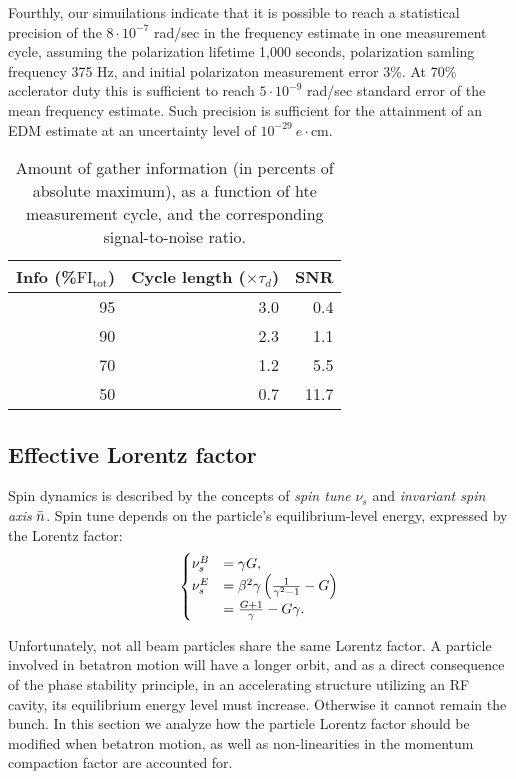 Fourthly, our simuilations indicate that it is possible to reach a statistical precision of the 
$8\cdot 10^{-7}$ rad/sec in the frequency estimate in one measurement cycle, assuming the polarization
lifetime 1,000 seconds, polarization samling frequency 375 Hz, and initial polarizaton measurement error 3\%.
At 70\% acclerator duty this is sufficient to reach $5\cdot 10^{-9}$ rad/sec standard error of the mean
frequency estimate. Such precision is sufficient for the attainment of an EDM estimate
at an uncertainty level of $10^{-29}~e\cdot$cm.

\begin{table}[h]
	\caption{Amount of gather information (in percents of absolute maximum), as a function of hte measurement cycle, and the corresponding signal-to-noise ratio.\label{tbl:FItot}}
	
	\centering
	\begin{tabular}{rrr}
		\hline
		Info (\%$\mathrm{FI_{tot}}$) & Cycle length ($\times\tau_d$) & SNR  \\
		\hline
		95            & 3.0                     & 0.4         \\
		90            & 2.3                     & 1.1         \\
		70            & 1.2                     & 5.5         \\
		50            & 0.7                     & 11.7        \\
		\hline
	\end{tabular}
\end{table}


\subsection{Effective Lorentz factor}\label{chpt1:FS-methods:effective-Lorentz-factor}
Spin dynamics is described by the concepts of \emph{spin tune} $\nu_s$ and \emph{invariant spin axis} $\bar n$.
Spin tune depends on the particle's  equilibrium-level energy, expressed by the Lorentz factor:
\begin{equation}\label{eq:spin_tune_vs_gamma}
  \begin{cases}
    \nu_s^B &= \gamma G, \\
    \nu_s^E &= \beta^2\gamma\bkt{\frac{1}{\gamma^2-1} - G} \\
            &= \frac{G+1}{\gamma} - G\gamma.
  \end{cases}
\end{equation}

Unfortunately, not all beam particles share the same Lorentz factor. A particle involved in betatron
motion will have a longer orbit, and as a direct consequence of the phase stability principle,
in an accelerating structure utilizing an RF cavity, its equilibrium energy level 
must increase. Otherwise it cannot remain the bunch. In this section we analyze how the particle Lorentz factor
should be modified when betatron motion, as well as non-linearities in the momentum compaction factor are
accounted for.

